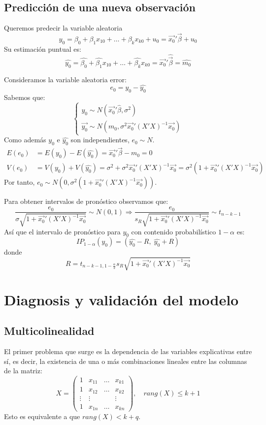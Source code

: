\subsection*{Predicción de una nueva observación}
Queremos predecir la variable aleatoria
$$y_0 = \beta_0 + \beta_1x_{10} + \dots + \beta_kx_{k0} + u_0 = \vec{x_0}'\vec{\beta} + u_0$$
Su estimación puntual es:
$$\hat{y_0} = \hat{\beta_0} + \hat{\beta_1}x_{10} + \dots + \hat{\beta_k}x_{k0} = \vec{x_0}'\hat{\vec{\beta}} = \hat{m_0}$$

Consideramos la variable aleatoria error:
$$e_0 = y_0 - \hat{y_0}$$
Sabemos que:
$$\begin{cases}
        y_0 \sim N(\vec{x_0}'\hat{\beta}, \sigma^2) \\
        \vec{y_0} \sim N(m_0, \sigma^2\vec{x_0}'(X'X)^{-1}\vec{x_0})
    \end{cases}$$
Como además $y_0$ e $\hat{y_0}$ son independientes, $e_0 \sim N$.
\begin{align*}
    E(e_0) & = E(y_0) - E(\hat{y_0}) = \vec{x_0}'\vec{\beta} - m_0 = 0                                                                 \\
    V(e_0) & = V(y_0) + V(\hat{y_0}) = \sigma^2 + \sigma^2\vec{x_0}'(X'X)^{-1}\vec{x_0} = \sigma^2 (1 + \vec{x_0}'(X'X)^{-1}\vec{x_0})
\end{align*}
Por tanto, $e_0 \sim N(0, \sigma^2 (1 + \vec{x_0}'(X'X)^{-1}\vec{x_0}))$.

Para obtener intervalos de pronóstico observamos que:
$$\frac{e_0}{\sigma\sqrt{1+\vec{x_0}'(X'X)^{-1}\vec{x_0}}} \sim N(0, 1) \Rightarrow \frac{e_0}{s_R\sqrt{1+\vec{x_0}'(X'X)^{-1}\vec{x_0}}} \sim t_{n-k-1}$$
Así que el intervalo de pronóstico para $y_0$ con contenido probabilístico $1-\alpha$ es:
$$IP_{1-\alpha}(y_0) = (\hat{y_0} - R, \; \hat{y_0} + R)$$
donde
$$R = t_{n-k-1, 1-\frac{\alpha}{2}} s_R\sqrt{1+\vec{x_0}'(X'X)^{-1}\vec{x_0}}$$

\section{Diagnosis y validación del modelo}
\subsection*{Multicolinealidad}
El primer problema que surge es la dependencia de las variables explicativas entre sí, es decir, la existencia de una o más combinaciones lineales entre las columnas de la matriz:
$$X = \begin{pmatrix}
        1      & x_{11} & \dots & x_{k1} \\
        1      & x_{12} & \dots & x_{k2} \\
        \vdots & \vdots &       & \vdots \\
        1      & x_{1n} & \dots & x_{kn}
    \end{pmatrix}, \quad rang(X) \leq k+1$$
Esto es equivalente a que $rang(X) < k+q$.

